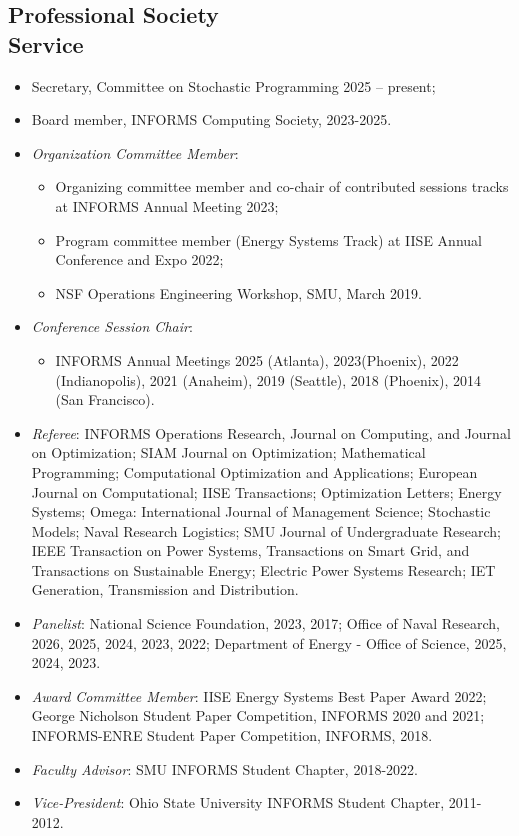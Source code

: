 \documentclass[hyperref, margin]{myResume}
\begin{document}
\begin{resume}
\section{Professional Society\\Service}
	\begin{itemize}[leftmargin=*]
		\item Secretary, Committee on Stochastic Programming 2025 -- present;
		\item Board member, INFORMS Computing Society, 2023-2025. 
		\item {\it Organization Committee Member}: 
		\begin{itemize}
			\item Organizing committee member and co-chair of contributed sessions tracks at INFORMS Annual Meeting 2023;
			\item Program committee member (Energy Systems Track) at IISE Annual Conference and Expo 2022;
			\item NSF Operations Engineering Workshop, SMU, March 2019.
		\end{itemize}
		\item \textit{Conference Session Chair}: 
		\begin{itemize}
			\item INFORMS Annual Meetings 2025 (Atlanta), 2023(Phoenix), 2022 (Indianopolis), 2021 (Anaheim), 2019 (Seattle), 2018 (Phoenix), 2014 (San Francisco). 
		\end{itemize}
		\item \textit{Referee}: INFORMS Operations Research, Journal on Computing, and Journal on Optimization; SIAM Journal on Optimization; Mathematical Programming; Computational Optimization and Applications; European Journal on Computational; IISE Transactions; Optimization Letters; Energy Systems; Omega: International Journal of Management Science; Stochastic Models; Naval Research Logistics; SMU Journal of Undergraduate Research; IEEE Transaction on Power Systems, Transactions on Smart Grid, and Transactions on Sustainable Energy; Electric Power Systems Research; IET Generation, Transmission and Distribution.
		\item {\it Panelist}: National Science Foundation, 2023, 2017; Office of Naval Research, 2026, 2025, 2024, 2023, 2022; Department of Energy - Office of Science, 2025, 2024, 2023.
		\item {\it Award Committee Member}: IISE Energy Systems Best Paper Award 2022; George Nicholson Student Paper Competition, INFORMS 2020 and 2021; INFORMS-ENRE Student Paper Competition, INFORMS, 2018.
		\item {\it Faculty Advisor}: SMU INFORMS Student Chapter, 2018-2022.
		\item \textit{Vice-President}: Ohio State University INFORMS Student Chapter, 2011-2012.
	\end{itemize}
	

\end{resume}
\end{document}
